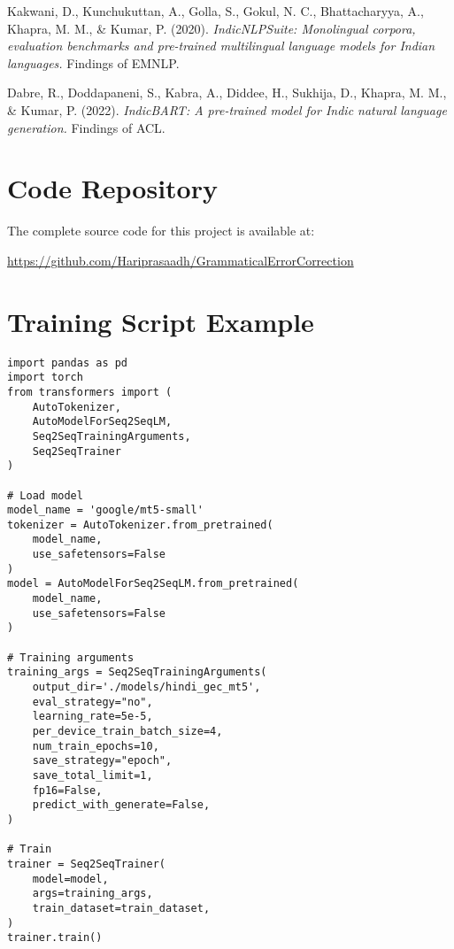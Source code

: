 \documentclass[12pt,a4paper]{article}
\begin{document}
\begin{thebibliography}{9}
Kakwani, D., Kunchukuttan, A., Golla, S., Gokul, N. C., Bhattacharyya, A., Khapra, M. M., \& Kumar, P. (2020).
\textit{IndicNLPSuite: Monolingual corpora, evaluation benchmarks and pre-trained multilingual language models for Indian languages.}
Findings of EMNLP.

Dabre, R., Doddapaneni, S., Kabra, A., Diddee, H., Sukhija, D., Khapra, M. M., \& Kumar, P. (2022).
\textit{IndicBART: A pre-trained model for Indic natural language generation.}
Findings of ACL.

\end{thebibliography}

\newpage

\appendix

\section{Code Repository}
The complete source code for this project is available at:
\begin{center}
\url{https://github.com/Hariprasaadh/GrammaticalErrorCorrection}
\end{center}

\section{Training Script Example}

\begin{lstlisting}[caption=Training Script for Hindi GEC]
import pandas as pd
import torch
from transformers import (
    AutoTokenizer, 
    AutoModelForSeq2SeqLM,
    Seq2SeqTrainingArguments,
    Seq2SeqTrainer
)

# Load model
model_name = 'google/mt5-small'
tokenizer = AutoTokenizer.from_pretrained(
    model_name, 
    use_safetensors=False
)
model = AutoModelForSeq2SeqLM.from_pretrained(
    model_name, 
    use_safetensors=False
)

# Training arguments
training_args = Seq2SeqTrainingArguments(
    output_dir='./models/hindi_gec_mt5',
    eval_strategy="no",
    learning_rate=5e-5,
    per_device_train_batch_size=4,
    num_train_epochs=10,
    save_strategy="epoch",
    save_total_limit=1,
    fp16=False,
    predict_with_generate=False,
)

# Train
trainer = Seq2SeqTrainer(
    model=model,
    args=training_args,
    train_dataset=train_dataset,
)
trainer.train()
\end{lstlisting}
\end{document}
